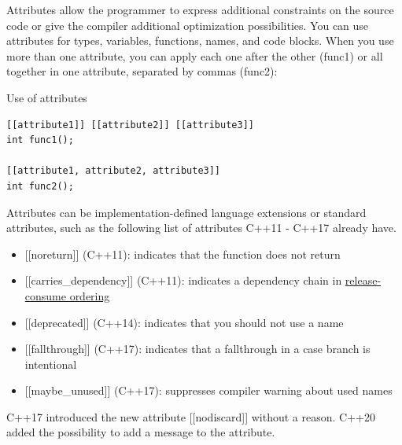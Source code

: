 \begin{tcolorbox}[colback=blue!5!white,colframe=blue!75!black,title={Attributes}]
Attributes allow the programmer to express additional constraints on the source code or give the compiler additional optimization possibilities. You can use attributes for types, variables, functions, names, and code blocks. When you use more than one attribute, you can apply each one after the other (func1) or all together in one attribute, separated by commas (func2):

\noindent
Use of attributes
\begin{lstlisting}[style=styleCXX]
[[attribute1]] [[attribute2]] [[attribute3]]
int func1();

[[attribute1, attribute2, attribute3]]
int func2();
\end{lstlisting}

Attributes can be implementation-defined language extensions or standard attributes, such as the following list of attributes C++11 - C++17 already have.

\begin{itemize}
\item 
{}[[noreturn]] (C++11): indicates that the function does not return

\item 
{}[[carries\_dependency]] (C++11): indicates a dependency chain in \href{https://en.cppreference.com/w/cpp/atomic/memory_order#Release-Consume_ordering}{release-consume ordering}

\item 
{}[[deprecated]] (C++14): indicates that you should not use a name

\item 
{}[[fallthrough]] (C++17): indicates that a fallthrough in a case branch is intentional

\item 
{}[[maybe\_unused]] (C++17): suppresses compiler warning about used names
\end{itemize}
\end{tcolorbox}



C++17 introduced the new attribute [[nodiscard]] without a reason. C++20 added the possibility to add a message to the attribute.

